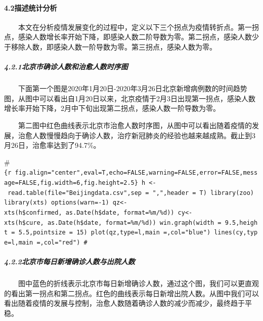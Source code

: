 \documentclass[12pt,a5paper,]{article}
\let\oldparagraph\paragraph
\renewcommand{\paragraph}[1]{\oldparagraph{#1}\mbox{}}
\let\oldsubparagraph\subparagraph
\renewcommand{\subparagraph}[1]{\oldsubparagraph{#1}\mbox{}}
\begin{document}
\hypertarget{ux63cfux8ff0ux7edfux8ba1ux5206ux6790}{%
\paragraph{4.2描述统计分析}\label{ux63cfux8ff0ux7edfux8ba1ux5206ux6790}}

  本文在分析疫情发展变化的过程中，定义以下三个拐点为疫情转折点。第一拐点，感染人数增长率开始下降，即感染人数二阶导数为零。第二拐点，感染人数少于移除人数，即感染人数一阶导数为零。第三拐点，感染人数为零。

\hypertarget{ux5317ux4eacux5e02ux786eux8bcaux4ebaux6570ux548cux6cbbux6108ux4ebaux6570ux65f6ux5e8fux56fe}{%
\subparagraph{4.2.1北京市确诊人数和治愈人数时序图}\label{ux5317ux4eacux5e02ux786eux8bcaux4ebaux6570ux548cux6cbbux6108ux4ebaux6570ux65f6ux5e8fux56fe}}

  下面第一个图是2020年1月20日-2020年3月26日北京新增病例数的时间趋势图，从图中可以看出自1月20日以来，北京疫情于2月3日出现第一拐点，感染人数增长率开始下降，2月中下旬出现第二拐点，感染人数一阶导数为零。

  第二图中红色曲线表示北京市治愈人数时序图，从图中可以看出随着疫情的发展，治愈人数慢慢趋向于确诊人数，治疗新冠肺炎的经验也越来越成熟。截止到3月26日，治愈率达到了94.7\%。

\#\texttt{\{r\ fig.align="center",eval=T,echo=FALSE,warning=FALSE,error=FALSE,message=FALSE,fig.width=6,fig.height=2.5\}\ h\ \textless{}-\ read.table(file="Beijingdata.csv",sep\ =\ ",",header\ =\ T)\ library(zoo)\ library(xts)\ options(warn=-1)\ qz\textless{}-xts(h\$confirmed,\ as.Date(h\$date,\ format=\textquotesingle{}\%m/\%d\textquotesingle{}))\ cy\textless{}-xts(h\$cure,\ as.Date(h\$date,\ format=\textquotesingle{}\%m/\%d\textquotesingle{}))\ win.graph(width\ =\ 9.5,height\ =\ 5.5,pointsize\ =\ 15)\ plot(qz,type=\textquotesingle{}l\textquotesingle{},main\ =\textquotesingle{}\textquotesingle{},col="blue")\ lines(cy,type=\textquotesingle{}l\textquotesingle{},main\ =\textquotesingle{}\textquotesingle{},col="red")\ \#}

\hypertarget{ux5317ux4eacux5e02ux6bcfux65e5ux65b0ux589eux786eux8bcaux4ebaux6570ux4e0eux51faux9662ux4ebaux6570}{%
\subparagraph{4.2.2北京市每日新增确诊人数与出院人数}\label{ux5317ux4eacux5e02ux6bcfux65e5ux65b0ux589eux786eux8bcaux4ebaux6570ux4e0eux51faux9662ux4ebaux6570}}

  图中蓝色的折线表示北京市每日新增确诊人数，通过这个图，我们可以更直观的看出第一拐点和第二拐点。红色的曲线表示每日新增出院人数。从图中我们可以看出随着疫情的发展与控制，治愈人数随着确诊人数的减少而减少，最终趋于平稳。
\end{document}
